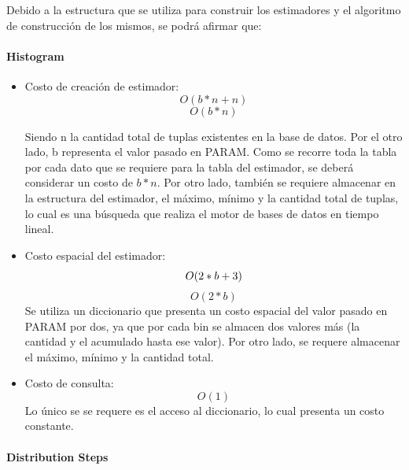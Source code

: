 \documentclass[10pt, a4paper,english,spanish,hidelinks]{article}
\begin{document}
Debido a la estructura que se utiliza para construir los estimadores y el algoritmo de construcción de los mismos, se podrá afirmar que:

\paragraph{Histogram}
\begin{itemize}

\item Costo de creación de estimador:
\begin{equation}
O(b * n + n )
\end{equation}
\begin{equation}
O(b * n)
\end{equation}

Siendo n la cantidad total de tuplas existentes en la base de datos. Por el otro lado, b representa el valor pasado en PARAM. Como se recorre toda la tabla por cada dato que se requiere para la tabla del estimador, se deberá considerar un costo de $b * n$. Por otro lado, también se requiere almacenar en la estructura del estimador, el máximo, mínimo y la cantidad total de tuplas, lo cual es una búsqueda que realiza el motor de bases de datos en tiempo lineal.

\item Costo espacial del estimador:
\begin{equation}
O(2 * b + 3 ) \\
\end{equation}
\begin{equation}
O(2 * b)
\end{equation}
Se utiliza un diccionario que presenta un costo espacial del valor pasado en PARAM por dos, ya que por cada bin se almacen dos valores más (la cantidad y el acumulado hasta ese valor). Por otro lado, se requere almacenar el máximo, mínimo y la cantidad total.

\item Costo de consulta:
\begin{equation}
O(1)
\end{equation}
Lo único se se requere es el acceso al diccionario, lo cual presenta un costo constante.

\end{itemize}
\paragraph{Distribution Steps}
\end{document}
